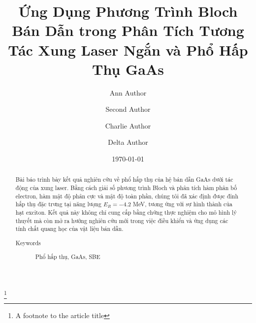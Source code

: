 \documentclass[%
 reprint,
 amsmath,amssymb,
 aps,
]{revtex4-2}
\begin{document}

\title{Ứng Dụng Phương Trình Bloch Bán Dẫn trong Phân Tích Tương Tác Xung Laser Ngắn và Phổ Hấp Thụ GaAs}
\thanks{A footnote to the article title}%

\author{Ann Author}
\author{Second Author}%
%


\author{Charlie Author}
%
%
\author{Delta Author}
%


\date{\today}

\begin{abstract}
Bài báo trình bày kết quả nghiên cứu về phổ hấp thụ của hệ bán dẫn GaAs dưới tác động của xung laser. Bằng cách giải số phương trình Bloch và phân tích hàm phân bố electron, hàm mật độ phân cực và mật độ toàn phần, chúng tôi đã xác định được đỉnh hấp thụ đặc trưng tại năng lượng $E_{R}=-4.2$ MeV, tương ứng với sự hình thành của hạt exciton. Kết quả này không chỉ cung cấp bằng chứng thực nghiệm cho mô hình lý thuyết mà còn mở ra hướng nghiên cứu mới trong việc điều khiển và ứng dụng các tính chất quang học của vật liệu bán dẫn.
\begin{description}
\item[Keywords]
Phổ hấp thụ, GaAs, SBE
\end{description}
\end{abstract}
\maketitle
\end{document}

